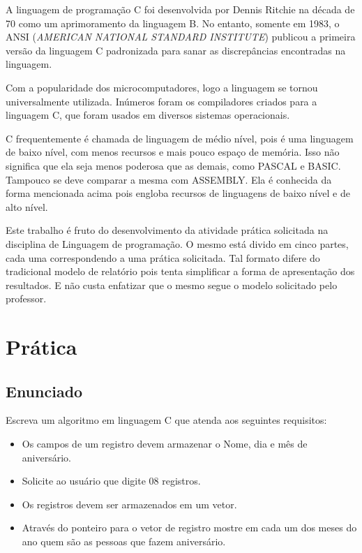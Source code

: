 \documentclass[
	12pt,				%
	openright,			%
	oneside,			%
	a4paper,			%
	chapter=TITLE,		%
	section=TITLE,		%
	english,			%
	french,				%
	spanish,			%
	brazil				%
	]{abntex2}
\begin{document}
A linguagem de programação C foi desenvolvida por Dennis Ritchie na década de 70 como um aprimoramento da linguagem B. No entanto, somente em 1983, o ANSI (\emph{AMERICAN NATIONAL STANDARD INSTITUTE}) publicou a primeira versão da linguagem C padronizada para sanar as discrepâncias encontradas na linguagem.

Com a popularidade dos microcomputadores, logo a linguagem se tornou universalmente utilizada. Inúmeros foram os compiladores criados para a linguagem C, que foram usados em diversos sistemas operacionais.

C frequentemente é chamada de linguagem de médio nível, pois é uma linguagem de baixo nível, com menos recursos e mais pouco espaço de memória. Isso não significa que ela seja menos poderosa que as demais, como PASCAL e BASIC. Tampouco se deve comparar a mesma com ASSEMBLY. Ela é conhecida da forma mencionada acima pois engloba recursos de linguagens de baixo nível e de alto nível.

Este trabalho é fruto do desenvolvimento da atividade prática solicitada na disciplina de Linguagem de programação. O mesmo está divido em cinco partes, cada uma correspondendo a uma prática solicitada. Tal formato difere do tradicional modelo de relatório pois tenta simplificar a forma de apresentação dos resultados. E não custa enfatizar que o mesmo segue o modelo solicitado pelo professor.

\chapter[\bfseries{PRÁTICA 1}]{\bfseries{Prática}}

\section[ENUNCIADO]{Enunciado}

	Escreva um algoritmo em linguagem C que atenda aos seguintes requisitos:

	\begin{itemize}[itemsep = -1mm]
		\item Os campos de um registro devem armazenar o Nome, dia e mês de aniversário.
		\item Solicite ao usuário que digite 08 registros.
		\item Os registros devem ser armazenados em um vetor.
		\item Através do ponteiro para o vetor de registro mostre em cada um dos meses do ano quem são as pessoas que fazem aniversário.
	\end{itemize}
\end{document}
